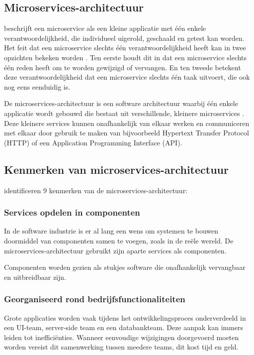 \subsection{Microservices-architectuur}

\textcite{Thoenes2015} beschrijft een microservice als een kleine applicatie met één enkele verantwoordelijkheid, die individueel uigerold, geschaald en getest kan worden. Het feit dat een microservice slechts één verantwoordelijkheid heeft kan in twee opzichten bekeken worden \autocite{Thoenes2015}. Ten eerste houdt dit in dat een microservice slechts één reden heeft om te worden gewijzigd of vervangen. En ten tweede betekent deze verantwoordelijkheid dat een microservice slechts één taak uitvoert, die ook nog eens eenduidig is.

De microservices-architectuur is een software architectuur waarbij één enkele applicatie wordt gebouwd die bestaat uit verschillende, kleinere microservices \autocite{Lewis2014}. Deze kleinere services kunnen onafhankelijk van elkaar werken en communiceren met elkaar door gebruik te maken van bijvoorbeeld Hypertext Transfer Protocol (HTTP) of een Application Programming Interface (API). 

\subsection{Kenmerken van microservices-\-architectuur}

\textcite{Lewis2014} identificeren 9 kenmerken van de microservices-architectuur:

\subsubsection{Services opdelen in componenten}

In de software industrie is er al lang een wens om systemen te bouwen doormiddel van componenten samen te voegen, zoals in de reële wereld. De microservices-architectuur gebruikt zijn aparte services als componenten.

Componenten worden gezien als stukjes software die onafhankelijk vervangbaar en uitbreidbaar zijn.

\subsubsection{Georganiseerd rond bedrijfsfunctionaliteiten}

Grote applicaties worden vaak tijdens het ontwikkelingsproces onderverdeeld in een UI-team, server-side team en een databankteam. Deze aanpak kan immers leiden tot inefficiënties. Wanneer eenvoudige wijzigingen doorgevoerd moeten worden vereist dit samenwerking tussen meedere teams, dit kost tijd en geld.

